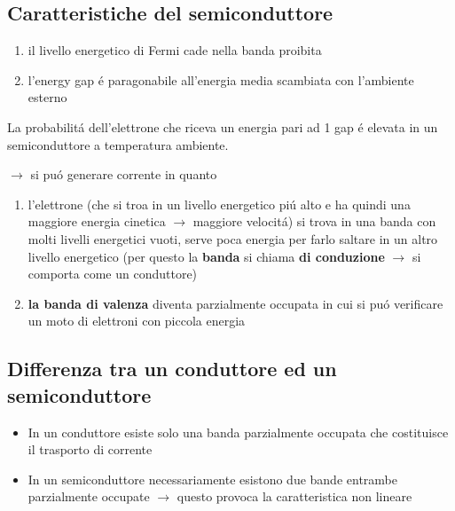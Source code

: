 \subsection{Caratteristiche del semiconduttore}
\begin{enumerate}
    \item il livello energetico di Fermi cade nella banda proibita
    \item l'energy gap \'e paragonabile all'energia media scambiata con l'ambiente esterno
\end{enumerate}

La probabilit\'a dell'elettrone che riceva un energia pari ad 1 gap \'e elevata in un semiconduttore a temperatura ambiente.

$\rightarrow$ si pu\'o generare corrente in quanto
\begin{enumerate}
    \item l'elettrone (che si troa in un livello energetico pi\'u alto e ha quindi una maggiore energia cinetica $\rightarrow$ maggiore velocit\'a) si trova in una banda con molti livelli energetici vuoti, serve poca energia per farlo saltare in un altro livello energetico (per questo la \textbf{banda} si chiama \textbf{di conduzione} $\rightarrow$ si comporta come un conduttore)
    \item \textbf{la banda di valenza} diventa parzialmente occupata in cui si pu\'o verificare un moto di elettroni con piccola energia
\end{enumerate}

\subsection{Differenza tra un conduttore ed un semiconduttore}
\begin{itemize}
    \item In un conduttore esiste solo una banda parzialmente occupata che costituisce il trasporto di corrente
    \item In un semiconduttore necessariamente esistono due bande entrambe parzialmente occupate $\rightarrow$ questo provoca la caratteristica non lineare
\end{itemize}

